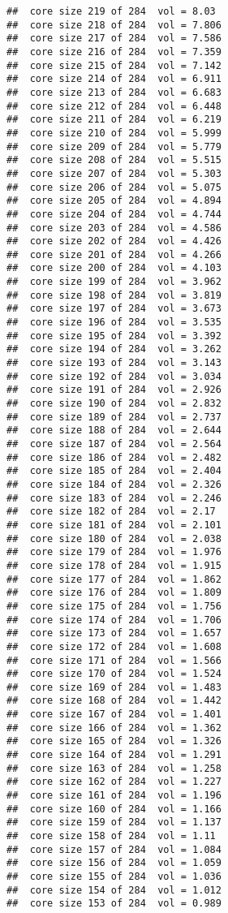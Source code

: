 \documentclass[
]{article}
\begin{document}
\begin{verbatim}
##  core size 219 of 284  vol = 8.03 
##  core size 218 of 284  vol = 7.806 
##  core size 217 of 284  vol = 7.586 
##  core size 216 of 284  vol = 7.359 
##  core size 215 of 284  vol = 7.142 
##  core size 214 of 284  vol = 6.911 
##  core size 213 of 284  vol = 6.683 
##  core size 212 of 284  vol = 6.448 
##  core size 211 of 284  vol = 6.219 
##  core size 210 of 284  vol = 5.999 
##  core size 209 of 284  vol = 5.779 
##  core size 208 of 284  vol = 5.515 
##  core size 207 of 284  vol = 5.303 
##  core size 206 of 284  vol = 5.075 
##  core size 205 of 284  vol = 4.894 
##  core size 204 of 284  vol = 4.744 
##  core size 203 of 284  vol = 4.586 
##  core size 202 of 284  vol = 4.426 
##  core size 201 of 284  vol = 4.266 
##  core size 200 of 284  vol = 4.103 
##  core size 199 of 284  vol = 3.962 
##  core size 198 of 284  vol = 3.819 
##  core size 197 of 284  vol = 3.673 
##  core size 196 of 284  vol = 3.535 
##  core size 195 of 284  vol = 3.392 
##  core size 194 of 284  vol = 3.262 
##  core size 193 of 284  vol = 3.143 
##  core size 192 of 284  vol = 3.034 
##  core size 191 of 284  vol = 2.926 
##  core size 190 of 284  vol = 2.832 
##  core size 189 of 284  vol = 2.737 
##  core size 188 of 284  vol = 2.644 
##  core size 187 of 284  vol = 2.564 
##  core size 186 of 284  vol = 2.482 
##  core size 185 of 284  vol = 2.404 
##  core size 184 of 284  vol = 2.326 
##  core size 183 of 284  vol = 2.246 
##  core size 182 of 284  vol = 2.17 
##  core size 181 of 284  vol = 2.101 
##  core size 180 of 284  vol = 2.038 
##  core size 179 of 284  vol = 1.976 
##  core size 178 of 284  vol = 1.915 
##  core size 177 of 284  vol = 1.862 
##  core size 176 of 284  vol = 1.809 
##  core size 175 of 284  vol = 1.756 
##  core size 174 of 284  vol = 1.706 
##  core size 173 of 284  vol = 1.657 
##  core size 172 of 284  vol = 1.608 
##  core size 171 of 284  vol = 1.566 
##  core size 170 of 284  vol = 1.524 
##  core size 169 of 284  vol = 1.483 
##  core size 168 of 284  vol = 1.442 
##  core size 167 of 284  vol = 1.401 
##  core size 166 of 284  vol = 1.362 
##  core size 165 of 284  vol = 1.326 
##  core size 164 of 284  vol = 1.291 
##  core size 163 of 284  vol = 1.258 
##  core size 162 of 284  vol = 1.227 
##  core size 161 of 284  vol = 1.196 
##  core size 160 of 284  vol = 1.166 
##  core size 159 of 284  vol = 1.137 
##  core size 158 of 284  vol = 1.11 
##  core size 157 of 284  vol = 1.084 
##  core size 156 of 284  vol = 1.059 
##  core size 155 of 284  vol = 1.036 
##  core size 154 of 284  vol = 1.012 
##  core size 153 of 284  vol = 0.989 

\end{verbatim}
\end{document}
